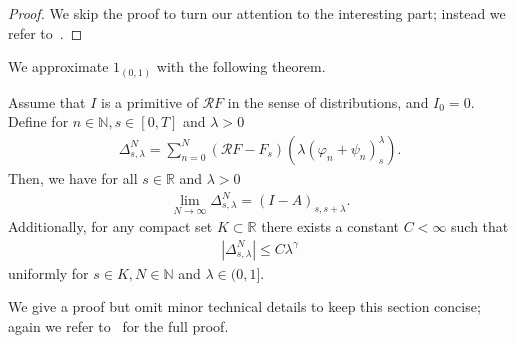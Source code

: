 \begin{proof}
  We skip the proof to turn our attention to the interesting part; instead we refer to~\cite[Lemma 5.2]{broux2021sewing}.
\end{proof}

We approximate \( 1_{(0,1)} \) with the following theorem.

\begin{theorem}
  Assume that \( I \) is a primitive of \( \mathcal{R}F \) in the sense of distributions, and \( I_0 = 0 \). Define for \( n \in \mathbb{N}, s \in [0,T] \) and \( \lambda > 0 \)
  \begin{align*}
    \Delta^N_{s, \lambda} = \sum^N_{n=0}(\mathcal{R}F - F_s)(\lambda(\varphi_n + \psi_n)^\lambda_s) .
  \end{align*}
  Then, we have for all \( s \in \mathbb{R} \) and \( \lambda > 0 \)
  \begin{align*}
    \lim_{N \to \infty} \Delta^N_{s, \lambda} = (I - A)_{s, s + \lambda}.
  \end{align*}
  Additionally, for any compact set \( K \subset \mathbb{R} \) there exists a constant \( C < \infty \) such that 
  \begin{align*}
    |\Delta^N_{s, \lambda}| \leq C \lambda^\gamma
  \end{align*}
  uniformly for \( s \in K, N \in \mathbb{N} \) and \( \lambda \in(0,1] \).
\end{theorem}

We give a proof but omit minor technical details to keep this section concise; again we refer to~\cite{broux2021sewing} for the full proof. 

